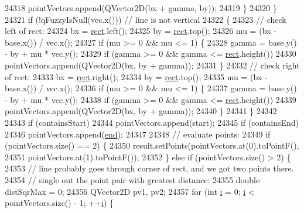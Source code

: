 \begin{DoxyCode}
24318         pointVectors.append(QVector2D(bx + gamma, by));
24319     \}
24320   \}
24321   \textcolor{keywordflow}{if} (!qFuzzyIsNull(vec.x())) \textcolor{comment}{// line is not vertical}
24322   \{
24323     \textcolor{comment}{// check left of rect:}
24324     bx = \hyperlink{_gen_blob_8m_aea8f6815d9a63491fc422c5572c6b3c3}{rect}.left();
24325     by = \hyperlink{_gen_blob_8m_aea8f6815d9a63491fc422c5572c6b3c3}{rect}.top();
24326     mu = (bx - base.x()) / vec.x();
24327     \textcolor{keywordflow}{if} (mu >= 0 && mu <= 1) \{
24328       gamma = base.y() - by + mu * vec.y();
24329       \textcolor{keywordflow}{if} (gamma >= 0 && gamma <= \hyperlink{_gen_blob_8m_aea8f6815d9a63491fc422c5572c6b3c3}{rect}.height())
24330         pointVectors.append(QVector2D(bx, by + gamma));
24331     \}
24332     \textcolor{comment}{// check right of rect:}
24333     bx = \hyperlink{_gen_blob_8m_aea8f6815d9a63491fc422c5572c6b3c3}{rect}.right();
24334     by = \hyperlink{_gen_blob_8m_aea8f6815d9a63491fc422c5572c6b3c3}{rect}.top();
24335     mu = (bx - base.x()) / vec.x();
24336     \textcolor{keywordflow}{if} (mu >= 0 && mu <= 1) \{
24337       gamma = base.y() - by + mu * vec.y();
24338       \textcolor{keywordflow}{if} (gamma >= 0 && gamma <= \hyperlink{_gen_blob_8m_aea8f6815d9a63491fc422c5572c6b3c3}{rect}.height())
24339         pointVectors.append(QVector2D(bx, by + gamma));
24340     \}
24341   \}
24342 
24343   \textcolor{keywordflow}{if} (containsStart)
24344     pointVectors.append(start);
24345   \textcolor{keywordflow}{if} (containsEnd)
24346     pointVectors.append(\hyperlink{class_q_c_p_item_line_a15598864c1c22a2497a1979c4980c4e1}{end});
24347 
24348   \textcolor{comment}{// evaluate points:}
24349   \textcolor{keywordflow}{if} (pointVectors.size() == 2) \{
24350     result.setPoints(pointVectors.at(0).toPointF(),
24351                      pointVectors.at(1).toPointF());
24352   \} \textcolor{keywordflow}{else} \textcolor{keywordflow}{if} (pointVectors.size() > 2) \{
24353     \textcolor{comment}{// line probably goes through corner of rect, and we got two points there.}
24354     \textcolor{comment}{// single out the point pair with greatest distance:}
24355     \textcolor{keywordtype}{double} distSqrMax = 0;
24356     QVector2D pv1, pv2;
24357     \textcolor{keywordflow}{for} (\textcolor{keywordtype}{int} \hyperlink{_comparision_pictures_2_createtest_image_8m_a6f6ccfcf58b31cb6412107d9d5281426}{i} = 0; \hyperlink{_comparision_pictures_2_createtest_image_8m_a6f6ccfcf58b31cb6412107d9d5281426}{i} < pointVectors.size() - 1; ++\hyperlink{_comparision_pictures_2_createtest_image_8m_a6f6ccfcf58b31cb6412107d9d5281426}{i}) \{

\end{DoxyCode}
